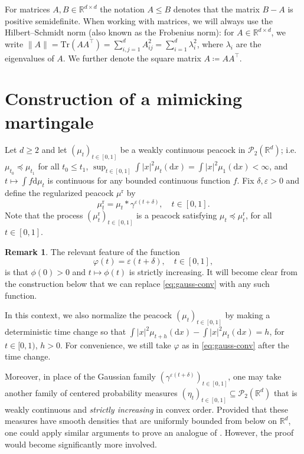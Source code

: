 \documentclass[12pt,oneside]{amsart}
\theoremstyle{definition}
\newtheorem{remark}[theorem]{Remark}
\newcommand{\D}{\mathrm{d}}
\newcommand{\R}{\mathbb R}
\newcommand{\Pc}{\mathcal P}
\newcommand{\reg}{\mathrm{r}}
\newcommand{\trace}{\mathrm{Tr}}
\def\R{{\mathbb R}}
\numberwithin{equation}{section}
\begin{document}
For matrices $A, B \in \R^{d \times d}$ the notation $A \leq B$ denotes that the matrix $B - A$ is positive semidefinite. When working with matrices, we will always use the Hilbert--Schmidt norm (also known as the Frobenius norm): for $A \in \R^{d \times d}$, we write $\lVert A \rVert = \trace(AA^\top) = \sum_{i, j = 1}^d A_{ij}^2 = \sum_{i = 1}^d \lambda_i^2$, where $\lambda_i$ are the eigenvalues of $A$. We further denote the square matrix $A \coloneqq A A^\top$.


\section{Construction of a mimicking martingale}\label{sec:proof-of-theorem}

Let $d \geq 2$ and let $(\mu_t)_{t \in [0, 1]}$ be a weakly continuous peacock in $\mathcal{P}_2(\R^d)$; i.e.~$\mu_{t_0} \preceq \mu_{t_1}$ for all $t_0 \leq t_1$, $\sup_{t \in [0, 1]} \int |x|^2 \mu_t(\D x) = \int |x|^2 \mu_1(\D x) < \infty$, and $t \mapsto \int f \D \mu_t$ is continuous for any bounded continuous function $f$. Fix $\delta, \varepsilon > 0$ and define the regularized peacock $\mu^\reg$ by
\begin{equation}\label{eq:reg-def}
	\mu^\reg_t = \mu_t \ast \gamma^{\varepsilon(t + \delta)}, \quad t \in [0, 1].
\end{equation}
Note that the process $(\mu^\reg_t)_{t \in [0, 1]}$ is a peacock satisfying $\mu_t \preceq \mu^\reg_t$, for all $t \in [0, 1]$.

\begin{remark}\label{rem:time-change}
	The relevant feature of the function
	\begin{equation}\label{eq:gauss-conv}
		\varphi(t) = \varepsilon (t + \delta), \quad t \in [0, 1],
	\end{equation}
	is that $\phi(0) > 0$ and $t \mapsto \phi(t)$ is strictly increasing. It will become clear from the construction below that we can replace \eqref{eq:gauss-conv} with any such function.
	
	In this context, we also normalize the peacock $(\mu_t)_{t \in [0, 1]}$ by making a deterministic time change so that $\int |x|^2 \mu_{t+h}(\D x) - \int |x|^2 \mu_t(\D x) = h$, for $t \in [0, 1)$, $h > 0$.
	For convenience, we still take $\varphi$ as in \eqref{eq:gauss-conv} after the time change.
	
	Moreover, in place of the Gaussian family $(\gamma^{\varepsilon(t + \delta)})_{t \in [0, 1]}$, one may take another family of centered probability measures $(\eta_t)_{t \in [0, 1]} \subseteq \Pc_2(\R^d)$ that is weakly continuous and \emph{strictly increasing} in convex order. Provided that these measures have smooth densities that are uniformly bounded from below on $\R^d$, one could apply similar arguments to prove an analogue of . However, the proof would become significantly more involved.
\end{remark}
\end{document}
